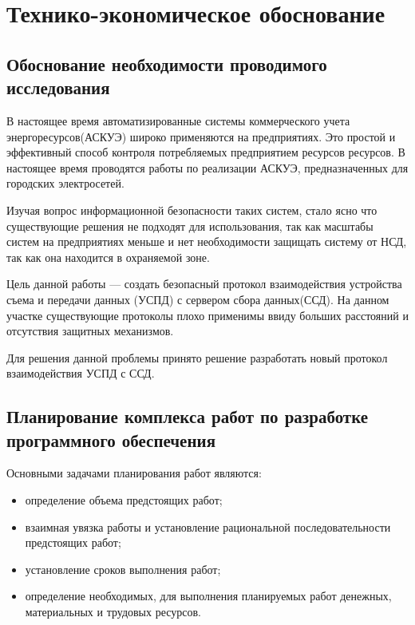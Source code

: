 \newpage
\section{Технико-экономическое обоснование}
\setcounter{figure}{0}

\subsection{Обоснование необходимости проводимого исследования}

В настоящее время автоматизированные системы коммерческого учета энергоресурсов(АСКУЭ) широко применяются на предприятиях. Это простой и эффективный способ контроля потребляемых предприятием ресурсов ресурсов. В настоящее время проводятся работы по реализации АСКУЭ, предназначенных для городских электросетей.

Изучая вопрос информационной безопасности таких систем, стало ясно
что существующие решения не подходят для использования, так как масштабы систем на предприятиях меньше и нет необходимости защищать систему от НСД, так как она находится в охраняемой зоне.

Цель данной работы — создать безопасный протокол взаимодействия устройства съема и передачи данных (УСПД) с сервером сбора данных(ССД). На данном участке существующие протоколы плохо применимы ввиду больших расстояний и отсутствия защитных механизмов.

Для решения данной проблемы принято решение разработать новый протокол взаимодействия УСПД с ССД.

\subsection{Планирование комплекса работ по разработке программного обеспечения}

Основными задачами планирования работ являются:

\begin{itemize}
 \item определение объема предстоящих работ;
 \item взаимная увязка работы и установление рациональной последовательности предстоящих работ;
 \item установление сроков выполнения работ;
 \item определение необходимых, для выполнения планируемых работ денежных, материальных и трудовых ресурсов.
\end{itemize}

